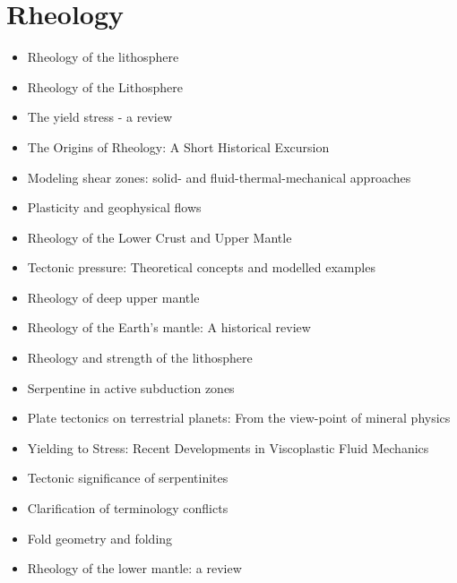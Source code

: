 \section{Rheology}
   \begin{itemize}
   \item [\nineteeneightythree] Rheology of the lithosphere \cite{kirb83}
   \item [\nineteeneightyseven] Rheology of the Lithosphere \cite{kikr87} \cite{ramu87}
   \item [\nineteenninetynine] The yield stress - a review \cite{barn99}
   \item [\twothousandtwo] The Origins of Rheology: A Short Historical Excursion \cite{dora02}
   \item [\twothousandthree] Modeling shear zones: solid- and fluid-thermal-mechanical approaches \cite{reyu03}
   \item [\twothousandseven] Plasticity and geophysical flows \cite{ance07}
   \item [\twothousandeight] Rheology of the Lower Crust and Upper Mantle \cite{budr08}
   \item [\twothousandeight] Tectonic pressure: Theoretical concepts and modelled examples \cite{manc08}
   \item [\twothousandten] Rheology of deep upper mantle \cite{kara10}
   \item [\twothousandten] Rheology of the Earth's mantle: A historical review \cite{kara10b}
   \item [\twothousandeleven] Rheology and strength of the lithosphere \cite{buro11}
   \item [\twothousandtwelve] Serpentine in active subduction zones \cite{reyn12}
   \item [\twothousandfourteen] Plate tectonics on terrestrial planets: From the view-point of mineral physics \cite{kara14}
   \item [\twothousandfourteen] Yielding to Stress: Recent Developments in Viscoplastic Fluid Mechanics \cite{bafo14}
   \item [\twothousandfifteen] Tectonic significance of serpentinites \cite{gusr15}
   \item [\twothousandtwentyone] Clarification of terminology conflicts \cite{wang21} 
   \item [\twothousandtwentyone] Fold geometry and folding \cite{nafo21} 
   \item [\twothousandtwentyfive] Rheology of the lower mantle: a review \cite{kagc25}
   \end{itemize}


